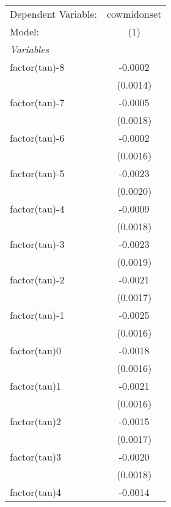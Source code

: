 \begingroup
\centering
\begin{tabular}{lc}
   \tabularnewline \midrule \midrule
   Dependent Variable:             & cowmidonset\\  
   Model:                          & (1)\\  
   \midrule
   \emph{Variables}\\
   factor(tau)-8                   & -0.0002\\   
                                   & (0.0014)\\   
   factor(tau)-7                   & -0.0005\\   
                                   & (0.0018)\\   
   factor(tau)-6                   & -0.0002\\   
                                   & (0.0016)\\   
   factor(tau)-5                   & -0.0023\\   
                                   & (0.0020)\\   
   factor(tau)-4                   & -0.0009\\   
                                   & (0.0018)\\   
   factor(tau)-3                   & -0.0023\\   
                                   & (0.0019)\\   
   factor(tau)-2                   & -0.0021\\   
                                   & (0.0017)\\   
   factor(tau)-1                   & -0.0025\\   
                                   & (0.0016)\\   
   factor(tau)0                    & -0.0018\\   
                                   & (0.0016)\\   
   factor(tau)1                    & -0.0021\\   
                                   & (0.0016)\\   
   factor(tau)2                    & -0.0015\\   
                                   & (0.0017)\\   
   factor(tau)3                    & -0.0020\\   
                                   & (0.0018)\\   
   factor(tau)4                    & -0.0014\\   

\end{tabular}
